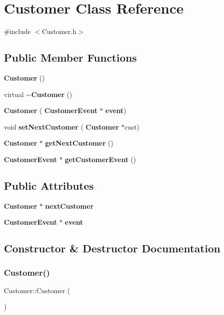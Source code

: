 \section{Customer Class Reference}
\label{classCustomer}


{\ttfamily \#include $<$Customer.\+h$>$}

\subsection*{Public Member Functions}
\begin{DoxyCompactItemize}
\item 
\textbf{ Customer} ()
\item 
virtual \textbf{ $\sim$\+Customer} ()
\item 
\textbf{ Customer} (\textbf{ Customer\+Event} $\ast$\textbf{ event})
\item 
void \textbf{ set\+Next\+Customer} (\textbf{ Customer} $\ast$cust)
\item 
\textbf{ Customer} $\ast$ \textbf{ get\+Next\+Customer} ()
\item 
\textbf{ Customer\+Event} $\ast$ \textbf{ get\+Customer\+Event} ()
\end{DoxyCompactItemize}
\subsection*{Public Attributes}
\begin{DoxyCompactItemize}
\item 
\textbf{ Customer} $\ast$ \textbf{ next\+Customer}
\item 
\textbf{ Customer\+Event} $\ast$ \textbf{ event}
\end{DoxyCompactItemize}


\subsection{Constructor \& Destructor Documentation}
\mbox{\label{classCustomer_abcc8fae9701e5ba9d7d6fe44498b34e3}} 
\subsubsection{Customer()\hspace{0.1cm}{\footnotesize\ttfamily [1/2]}}
{\footnotesize\ttfamily Customer\+::\+Customer (\begin{DoxyParamCaption}{ }\end{DoxyParamCaption})}

